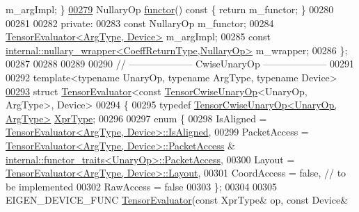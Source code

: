 \begin{DoxyCode}
      m\_argImpl; \}
\hyperlink{struct_eigen_1_1_tensor_evaluator_3_01const_01_tensor_cwise_nullary_op_3_01_nullary_op_00_01_arg_type_01_4_00_01_device_01_4_a9526ddfd7e9532ffdcb3e3ff8defb11f}{00279}   NullaryOp \hyperlink{struct_eigen_1_1_tensor_evaluator_3_01const_01_tensor_cwise_nullary_op_3_01_nullary_op_00_01_arg_type_01_4_00_01_device_01_4_a9526ddfd7e9532ffdcb3e3ff8defb11f}{functor}()\textcolor{keyword}{ const }\{ \textcolor{keywordflow}{return} m\_functor; \}
00280 
00281 
00282  \textcolor{keyword}{private}:
00283   \textcolor{keyword}{const} NullaryOp m\_functor;
00284   \hyperlink{struct_eigen_1_1_tensor_evaluator}{TensorEvaluator<ArgType, Device>} m\_argImpl;
00285   \textcolor{keyword}{const} \hyperlink{struct_eigen_1_1internal_1_1nullary__wrapper}{internal::nullary\_wrapper<CoeffReturnType,NullaryOp>}
       m\_wrapper;
00286 \};
00287 
00288 
00289 
00290 \textcolor{comment}{// -------------------- CwiseUnaryOp --------------------}
00291 
00292 \textcolor{keyword}{template}<\textcolor{keyword}{typename} UnaryOp, \textcolor{keyword}{typename} ArgType, \textcolor{keyword}{typename} Device>
\hyperlink{struct_eigen_1_1_tensor_evaluator_3_01const_01_tensor_cwise_unary_op_3_01_unary_op_00_01_arg_type_01_4_00_01_device_01_4}{00293} \textcolor{keyword}{struct }\hyperlink{struct_eigen_1_1_tensor_evaluator}{TensorEvaluator}<const \hyperlink{class_eigen_1_1_tensor_cwise_unary_op}{TensorCwiseUnaryOp}<UnaryOp, ArgType>, Device>
00294 \{
00295   \textcolor{keyword}{typedef} \hyperlink{class_eigen_1_1_tensor_cwise_unary_op}{TensorCwiseUnaryOp<UnaryOp, ArgType>} 
      \hyperlink{class_eigen_1_1_tensor_cwise_unary_op}{XprType};
00296 
00297   \textcolor{keyword}{enum} \{
00298     IsAligned = \hyperlink{struct_eigen_1_1_tensor_evaluator}{TensorEvaluator<ArgType, Device>::IsAligned},
00299     PacketAccess = \hyperlink{struct_eigen_1_1_tensor_evaluator}{TensorEvaluator<ArgType, Device>::PacketAccess}
       & \hyperlink{struct_eigen_1_1internal_1_1functor__traits}{internal::functor\_traits<UnaryOp>::PacketAccess},
00300     Layout = \hyperlink{struct_eigen_1_1_tensor_evaluator}{TensorEvaluator<ArgType, Device>::Layout},
00301     CoordAccess = \textcolor{keyword}{false},  \textcolor{comment}{// to be implemented}
00302     RawAccess = \textcolor{keyword}{false}
00303   \};
00304 
00305   EIGEN\_DEVICE\_FUNC \hyperlink{struct_eigen_1_1_tensor_evaluator}{TensorEvaluator}(\textcolor{keyword}{const} XprType& op, \textcolor{keyword}{const} Device& 

\end{DoxyCode}

